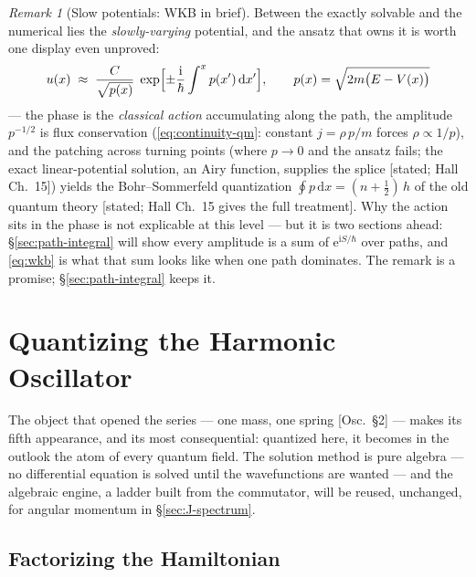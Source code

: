 \documentclass[11pt]{article}
\theoremstyle{plain}
\theoremstyle{definition}
\theoremstyle{remark}
\newtheorem{remark}[theorem]{Remark}
\newcommand{\dd}{\mathrm{d}}
\newcommand{\ee}{\mathrm{e}}
\newcommand{\ii}{\mathrm{i}}
\begin{document}
\begin{remark}[Slow potentials: WKB in brief]
\label{rem:wkb}
Between the exactly solvable and the numerical lies the
\emph{slowly-varying} potential, and the ansatz that owns it is
worth one display even unproved:
\begin{equation}
  u(x) \;\approx\;
  \frac{C}{\sqrt{p(x)}}\;
  \exp\Bigl[\pm\frac{\ii}{\hbar}\int^x p(x')\,\dd x'\Bigr],
  \qquad
  p(x) = \sqrt{2m\bigl(E - V(x)\bigr)}
  \label{eq:wkb}
\end{equation}
--- the phase is the \emph{classical action} accumulating along the
path, the amplitude $p^{-1/2}$ is flux conservation
(\eqref{eq:continuity-qm}: constant $j = \rho\,p/m$ forces
$\rho \propto 1/p$), and the patching across turning points (where
$p \to 0$ and the ansatz fails; the exact linear-potential solution,
an Airy function, supplies the splice [stated; Hall Ch.\ 15]) yields the
Bohr--Sommerfeld quantization $\oint p\,\dd x = (n + \tfrac12)\,h$
of the old quantum theory [stated; Hall Ch.\ 15 gives the full
treatment].
Why the action sits in the phase is not explicable at this level ---
but it is two sections ahead: \S\ref{sec:path-integral} will show
every amplitude is a sum of $\ee^{\ii S/\hbar}$ over paths, and
\eqref{eq:wkb} is what that sum looks like when one path dominates.
The remark is a promise; \S\ref{sec:path-integral} keeps
it.
\end{remark}


\section{Quantizing the Harmonic Oscillator}
\label{sec:sho-quantum}

The object that opened the series --- one mass, one spring
[Osc.\ \S2] --- makes its fifth appearance, and its most
consequential: quantized here, it becomes in the outlook the atom
of every quantum field. The solution method is pure algebra --- no
differential equation is solved until the wavefunctions are wanted
--- and the algebraic engine, a ladder built from the commutator,
will be reused, unchanged, for angular momentum in
\S\ref{sec:J-spectrum}.

\subsection{Factorizing the Hamiltonian}
\label{sec:factorizing}
\end{document}
